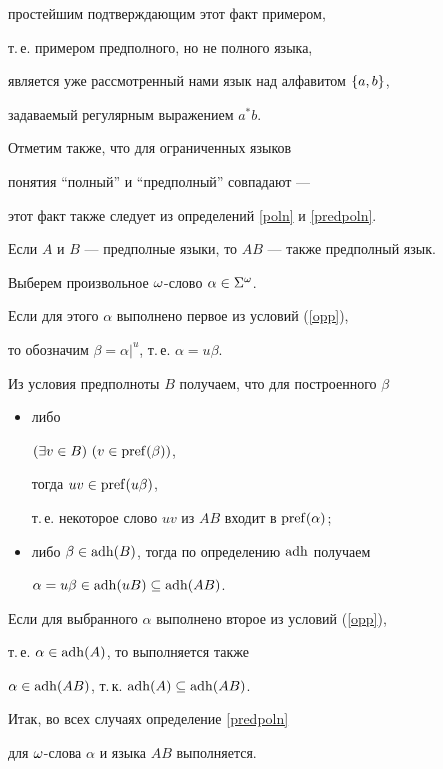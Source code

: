  простейшим подтверждающим этот факт примером,


 т.\,е. примером предполного, но не полного языка,


 является уже рассмотренный нами язык над алфавитом $\{ a,b \}$,


 задаваемый регулярным выражением $a^*b$.


 Отметим также, что для ограниченных языков


 понятия ``полный'' и ``предполный'' совпадают ---


 этот факт также следует из определений \ref{poln} и \ref{predpoln}.





 \begin{props} \label{upp}


 Если $A$ и $B$ --- предполные языки, то $AB$ --- также предполный язык.


 \end{props}





\begin{pf}


 Выберем произвольное $\omega$-слово $\alpha\in\Sigma^\omega$.


 Если для этого $\alpha$ выполнено первое из условий (\ref{opp}),


 то обозначим $\beta=\alpha|^u$, т.\,е. $\alpha=u\beta$.


 Из условия предполноты $B$ получаем, что для построенного $\beta$


 \begin{itemize}


\item[--] либо


$(\exists v\in B)\ (v\in\pref(\beta))$,


тогда $uv\in\operatorname{pref}(u\beta)$,


т.\,е. некоторое слово $uv$ из $AB$ входит в $\operatorname{pref}(\alpha)$;


\item[--]


либо $\beta\in\operatorname{adh}(B)$, тогда по определению $\operatorname{adh}$ получаем


$\alpha=u\beta\in\operatorname{adh}(uB)\subseteq\operatorname{adh}(AB)$.


\end{itemize}


Если для выбранного $\alpha$ выполнено второе из условий (\ref{opp}),


т.\,е. $\alpha\in\operatorname{adh}(A)$, то выполняется также


$\alpha\in\operatorname{adh}(AB)$, т.\,к. $\operatorname{adh}(A)\subseteq\operatorname{adh}(AB)$.





 Итак, во всех случаях определение \ref{predpoln}


 для $\omega$-слова $\alpha$ и языка $AB$ выполняется.


\end{pf}





